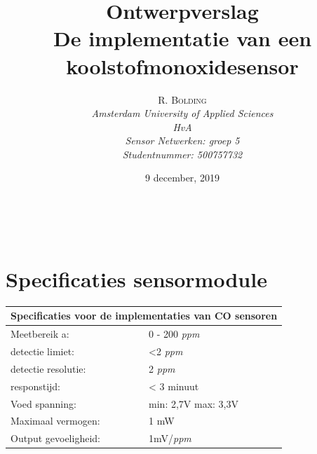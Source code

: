\documentclass[a4paper, 11pt]{article} %
\title{\textbf{Ontwerpverslag}\\ %
	De implementatie van een koolstofmonoxidesensor} %
\author{\textsc{R. Bolding} %
	\\{\textit{Amsterdam University of Applied Sciences\\ 
			HvA\\
			Sensor Netwerken: groep 5\\
			Studentnummer: 500757732}}} %
\date{9 december, 2019} %
\makeatletter
\renewcommand{\maketitle}{ %
	\begin{flushright} %
		{\LARGE\@title} %
		
		\vspace{50pt} %
		
		{\large\@author} %
		\\\@date %
		
		\vspace{40pt} %
	\end{flushright}
}
\makeatother
\begin{document}
	\captionsetup{justification=centering}
	\renewcommand{\contentsname}{Inhoudsopgave}
	\def\textsubscript#1{\ensuremath{_{\mbox{\textscale{.6}{#1}}}}}
	\hypersetup{hidelinks=true}
	\maketitle %
	
	
	
	
	\vspace{10pt} %
	
	\newpage
	\tableofcontents
	\newpage
	\section{Specificaties sensormodule} \label{sec::specificaties}
	\begin{center}
		\begin{tabular}{ | m{5cm} | m{5cm}| } 
			\hline
			\multicolumn{2}{|c|}{Specificaties voor de implementaties van CO sensoren} \\
			\hline
			Meetbereik a: & 0 - 200 \textit{ppm} \\
			\hline
			detectie limiet:  & <2 \textit{ppm}
			\\ 
			\hline
			detectie resolutie: & 2 \textit{ppm} 
			\\ 
			\hline
			responstijd: & < 3 minuut
			\\ 
			\hline
			Voed spanning: & min: 2,7V max: 3,3V
			\\ 
			\hline
			Maximaal vermogen: & 1 mW
			\\
			\hline
			Output gevoeligheid: & 1mV/\textit{ppm}
			\\
			\hline
		\end{tabular}
	\end{center}
\end{document}
